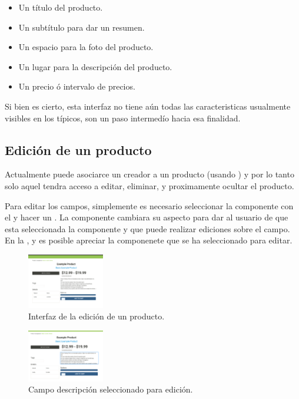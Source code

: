 \begin{itemize}
	\item
		Un título del producto.
	\item
		Un subtítulo para dar un resumen.
	\item
		Un espacio para la foto del producto.
	\item
		Un lugar para la descripción del producto.
	\item
		Un precio ó intervalo de precios.
\end{itemize}

Si bien es cierto, esta interfaz no tiene aún todas las caracteristicas usualmente visibles en los \websitesINT \ecommerceCOM típicos, son un paso intermedío hacia esa finalidad.

 \subsection{Edición de un producto}

Actualmente puede asociarce un creador a un producto (usando \fixturesPC) y por lo tanto solo aquel tendra acceso a editar, eliminar, y proximamente ocultar el producto.

Para editar los campos, simplemente es necesario seleccionar la componente con el \mouse y hacer un \click. La componente cambiara su aspecto para dar \feedback al usuario de que esta seleccionada la componente y que puede realizar ediciones sobre el campo. En la ,  y  es posible apreciar la componenete que se ha seleccionado para editar.

\begin{figure}[H]
	\centering
	\includegraphics[width=0.3\textwidth]{figuras/productos/interfaz_edicion_producto.png}

	\caption{Interfaz de la edición de un producto.}
	\label{figure:features:interfaz_edicion_producto}
\end{figure}

\begin{figure}[H]
	\centering
	\includegraphics[width=0.3\textwidth]{figuras/productos/interfaz_edicion_editando_description.png}

	\caption{Campo descripción seleccionado para edición.}
	\label{figure:features:interfaz_edicion_editando_description}
\end{figure}


